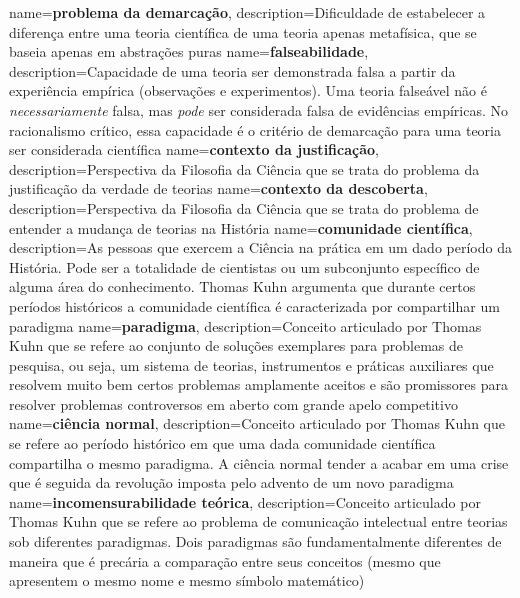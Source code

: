 {
    name=\textbf{problema da demarcação},
    description={Dificuldade de estabelecer a diferença entre uma teoria científica de uma teoria apenas metafísica, que se baseia apenas em abstrações puras}
}
{
    name=\textbf{falseabilidade},
    description={Capacidade de uma teoria ser demonstrada falsa a partir da experiência empírica (observações e experimentos). Uma teoria falseável não é \textit{necessariamente} falsa, mas \textit{pode} ser considerada falsa de evidências empíricas. No racionalismo crítico, essa capacidade é o critério de demarcação para uma teoria ser considerada científica}
}
{
    name=\textbf{contexto da justificação},
    description={Perspectiva da Filosofia da Ciência que se trata do problema da justificação da verdade de teorias}
}
{
    name=\textbf{contexto da descoberta},
    description={Perspectiva da Filosofia da Ciência que se trata do problema de entender a mudança de teorias na História}
}
{
    name=\textbf{comunidade científica},
    description={As pessoas que exercem a Ciência na prática em um dado período da História. Pode ser a totalidade de cientistas ou um subconjunto específico de alguma área do conhecimento. Thomas Kuhn argumenta que durante certos períodos históricos a comunidade científica é caracterizada por compartilhar um paradigma}
}
{
    name=\textbf{paradigma},
    description={Conceito articulado por Thomas Kuhn que se refere ao conjunto de soluções exemplares para problemas de pesquisa, ou seja, um sistema de teorias, instrumentos e práticas auxiliares que resolvem muito bem certos problemas amplamente aceitos e são promissores para resolver problemas controversos em aberto com grande apelo competitivo}
}
{
    name=\textbf{ciência normal},
    description={Conceito articulado por Thomas Kuhn que se refere ao período histórico em que uma dada comunidade científica compartilha o mesmo paradigma. A ciência normal tender a acabar em uma crise que é seguida da revolução imposta pelo advento de um novo paradigma}
}
{
    name=\textbf{incomensurabilidade teórica},
    description={Conceito articulado por Thomas Kuhn que se refere ao problema de comunicação intelectual entre teorias sob diferentes paradigmas. Dois paradigmas são fundamentalmente diferentes de maneira que é precária a comparação entre seus conceitos (mesmo que apresentem o mesmo nome e mesmo símbolo matemático)}
}

